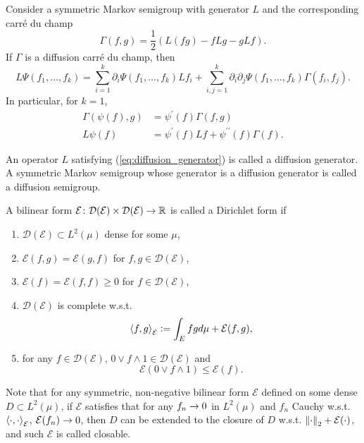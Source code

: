 Consider a symmetric Markov semigroup with generator $L$ and the corresponding carr\'e du champ
\begin{equation*}
	\Gamma(f, g)=\frac{1}{2}(L(f g)-f L g-g L f).
\end{equation*}
If $\Gamma$ is a diffusion carr\'e du champ, then
\begin{equation}\label{eq:diffusion_generator}
	L \Psi\left(f_1, \ldots, f_k\right)=\sum_{i=1}^k \partial_i \Psi\left(f_1, \ldots, f_k\right) L f_i+\sum_{i, j=1}^k \partial_i \partial_j \Psi\left(f_1, \ldots, f_k\right) \Gamma\left(f_i, f_j\right).
\end{equation}
In particular, for $k = 1$,
\begin{align*}
	\Gamma(\psi(f), g) & =\psi^{\prime}(f) \Gamma(f, g) \\
	L \psi(f) & =\psi^{\prime}(f) L f+\psi^{\prime \prime}(f) \Gamma(f).
\end{align*}

\begin{defn}
    An operator $L$ satisfying (\ref{eq:diffusion_generator}) is called a diffusion generator. A symmetric Markov semigroup whose generator is a diffusion generator is called a diffusion semigroup.
\end{defn}

\begin{defn}
    A bilinear form $\mathcal{E} \colon \mathcal{D}(\mathcal{E}) \times \mathcal{D}(\mathcal{E}) \rightarrow \mathbb{R}$ is called a Dirichlet form if
    \begin{enumerate}[label=(\roman*)]
    	\item $\mathcal{D}(\mathcal{E}) \subset L^2(\mu)$ dense for some $\mu$,
    	\item $\mathcal{E}(f,g) = \mathcal{E}(g,f)$ for $f,g \in \mathcal{D}(\mathcal{E})$,
    	\item $\mathcal{E}(f) = \mathcal{E}(f,f) \geq 0$ for $f \in \mathcal{D}(\mathcal{E})$,
    	\item $\mathcal{D}(\mathcal{E})$ is complete w.s.t. 
    	\begin{equation*}
    		\left\langle f,g \right\rangle_{\mathcal{E}} \vcentcolon= \int_Efgd\mu + \mathcal{E}(f,g),
    	\end{equation*}
    	\item for any $f \in \mathcal{D}(\mathcal{E})$, $0 \vee f \wedge 1 \in \mathcal{D}(\mathcal{E})$ and
    	\begin{equation*}
    		\mathcal{E}(0 \vee f \wedge 1) \leq \mathcal{E}(f).
    	\end{equation*}
    \end{enumerate}
\end{defn}
\begin{rmk}
    Note that for any symmetric, non-negative bilinear form $\mathcal{E}$ defined on some dense $D \subset L^2(\mu)$, if $\mathcal{E}$ satisfies that for any $f_n \rightarrow 0$ in $L^2(\mu)$ and $f_n$ Cauchy w.s.t. $\left\langle \cdot,\cdot \right\rangle_{\mathcal{E}}$, $\mathcal{E}(f_n) \rightarrow 0$, then $D$ can be extended to the closure of $D$ w.s.t. $\left\lVert\cdot\right\lVert_2+\mathcal{E}(\cdot)$, and such $\mathcal{E}$ is called closable.
\end{rmk}

